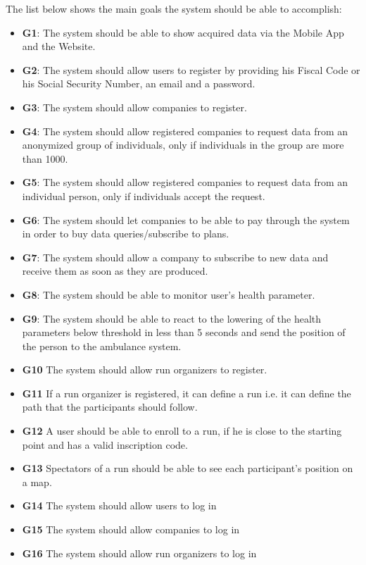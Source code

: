 The list below shows the main goals the system should be able to accomplish:

\begin{itemize}
    \item \textbf{G1}: The system should be able to show acquired data via the Mobile App and the Website.
    \item \textbf{G2}: The system should allow users to register by providing his Fiscal Code or his Social Security Number, an email and a password.
    \item \textbf{G3}: The system should allow companies to register.
    \item \textbf{G4}: The system should allow registered companies to request data from an anonymized group of individuals, only if individuals in the group are more than 1000.
    \item \textbf{G5}: The system should allow registered companies to request data from an individual person, only if individuals accept the request.

    \item \textbf{G6}: The system should let companies to be able to pay through the system in order to buy data queries/subscribe to plans.

    \item \textbf{G7}: The system should allow a company to subscribe to new data and receive them as soon as they are produced.
    \item \textbf{G8}: The system should be able to monitor user's health parameter.
    \item \textbf{G9}: The system should be able to react to the lowering of the health parameters below threshold in less than 5 seconds and send the position of the person to the ambulance system. 
    
    \item \textbf{G10} The system should allow run organizers to register.
    \item \textbf{G11} If a run organizer is registered, it can define a run i.e. it can define the path that the participants should follow.
    \item \textbf{G12} A user should be able to enroll to a run, if he is close to the starting point and has a valid inscription code.
    \item \textbf{G13} Spectators of a run should be able to see each participant's position on a map.
    \item \textbf{G14} The system should allow users to log in
    \item \textbf{G15} The system should allow companies to log in
    \item \textbf{G16} The system should allow run organizers to log in
\end{itemize}





